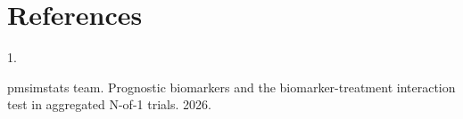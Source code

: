 \documentclass[
  11pt,
]{article}
\newlength{\cslhangindent}
\newlength{\csllabelwidth}
\newenvironment{CSLReferences}[2] %
 {\begin{list}{}{%
  \setlength{\itemindent}{0pt}
  \setlength{\leftmargin}{0pt}
  \setlength{\parsep}{0pt}
  \ifodd #1
   \setlength{\leftmargin}{\cslhangindent}
   \setlength{\itemindent}{-1\cslhangindent}
  \fi
  \setlength{\itemsep}{#2\baselineskip}}}
 {\end{list}}
\newcommand{\CSLLeftMargin}[1]{\parbox[t]{\csllabelwidth}{\strut#1\strut}}
\newcommand{\CSLRightInline}[1]{\parbox[t]{\linewidth - \csllabelwidth}{\strut#1\strut}}
\begin{document}
\section*{References}\label{references}

\protect{}\label{refs}
\begin{CSLReferences}{0}{1}
\CSLLeftMargin{1. }%
\CSLRightInline{{pmsimstats team}. Prognostic biomarkers and the biomarker-treatment interaction test in aggregated {N}-of-1 trials. 2026.}

\end{CSLReferences}
\end{document}
